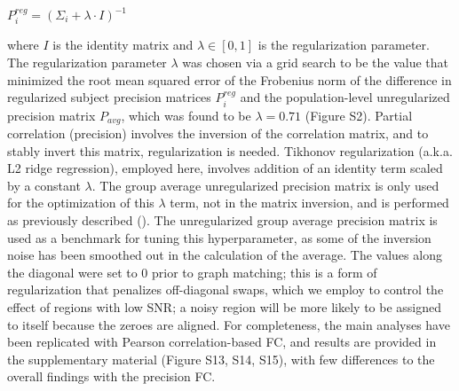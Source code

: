 \documentclass[phd,tocprelim]{cornell}
\begin{document}
\begin{center}

        $P_i^{reg} = (\Sigma_i + \lambda \cdot I)^{-1}$

\end{center}

    where $I$ is the identity matrix and $\lambda \in [0,1]$ is the regularization parameter. The regularization parameter $\lambda$ was chosen via a grid search to be the value that minimized the root mean squared error of the Frobenius norm of the difference in regularized subject precision matrices $P_i^{reg}$ and the population-level unregularized precision matrix $P_{avg}$, which was found to be $\lambda = 0.71$ (Figure S2). Partial correlation (precision) involves the inversion of the correlation matrix, and to stably invert this matrix, regularization is needed. Tikhonov regularization (a.k.a. L2 ridge regression), employed here, involves addition of an identity term scaled by a constant $\lambda$. The group average unregularized precision matrix is only used for the optimization of this $\lambda$ term, not in the matrix inversion, and is performed as previously described (\cite{Liegeois2020-ua, Golub1999-ou}). The unregularized group average precision matrix is used as a benchmark for tuning this hyperparameter, as some of the inversion noise has been smoothed out in the calculation of the average. The values along the diagonal were set to 0 prior to graph matching; this is a form of regularization that penalizes off-diagonal swaps, which we employ to control the effect of regions with low SNR; a noisy region will be more likely to be assigned to itself because the zeroes are aligned. For completeness, the main analyses have been replicated with Pearson correlation-based FC, and results are provided in the supplementary material (Figure S13, S14, S15), with few differences to the overall findings with the precision FC.
    
\end{document}
